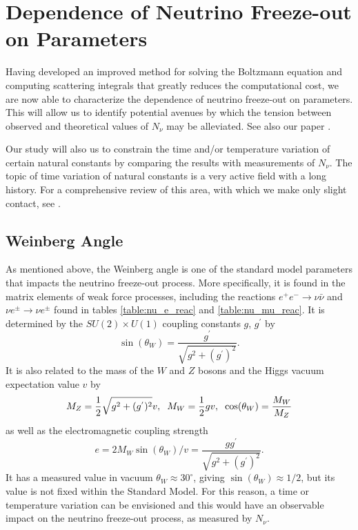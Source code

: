 \section{Dependence of Neutrino Freeze-out on Parameters}\label{ch:param_studies}
Having developed an improved method for solving the Boltzmann equation and computing scattering integrals that greatly reduces the computational cost, we are now able to characterize the dependence of neutrino freeze-out on parameters.  This will allow us to identify potential avenues by which the tension between observed and theoretical values of $N_\nu$ may be alleviated.  See also our paper \cite{Birrell:2014uka}.

Our study will also us to constrain the time and/or temperature variation of certain natural constants by comparing the results with measurements of $N_\nu$.  The topic of time variation of natural constants is a very active field with a long history. For a comprehensive review of this area, with which we make only slight contact,  see \cite{Uzan:2010pm}.



\subsection{Weinberg Angle}

As mentioned above, the Weinberg angle is one of the standard model parameters that impacts the neutrino freeze-out process.  More specifically, it is found in the matrix elements of weak force processes, including the reactions $e^+e^-\rightarrow \nu\bar\nu$ and $\nu e^\pm\rightarrow \nu e^\pm$ found in tables \ref{table:nu_e_reac} and \ref{table:nu_mu_reac}.  It is determined by the $SU(2)\times U(1)$ coupling constants $g$, $g^{'}$  by
\begin{equation}
\sin(\theta_W)=\frac{g^{'}}{\sqrt{g^2+(g^{'})^2}}.
\end{equation}
It is also related to the mass of the $W$ and $Z$ bosons and the Higgs vacuum expectation value $v$ by
\begin{equation}
M_Z=\frac{1}{2}\sqrt{g^2+(g^{'})^2}v,\hspace{2mm}  M_W=\frac{1}{2}gv,\hspace{2mm} \cos(\theta_W)=\frac{M_W}{M_Z}
\end{equation}
as well as the electromagnetic coupling strength
\begin{equation}
e=2M_W\sin(\theta_W)/v=\frac{gg^{'}}{\sqrt{g^2+(g^{'})^2}}.
\end{equation}
It has a measured value in vacuum $\theta_W\approx 30^\circ$, giving $\sin(\theta_W)\approx 1/2$, but its value is not fixed within the Standard Model. For this reason, a time or temperature variation can be envisioned and this would have an observable impact on the neutrino freeze-out process, as measured by $N_\nu$.

